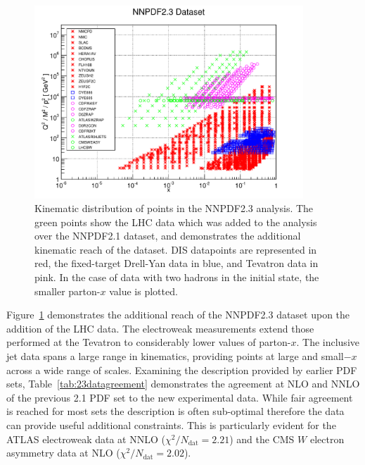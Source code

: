 \begin{figure}[h!]
\centering
\includegraphics[width=0.9\textwidth]{6-LHCimpact/figs/kin23.pdf}
\caption[Kinematic distribution of data points in the NNPDF2.3 analysis]{Kinematic distribution of points in the NNPDF2.3 analysis. The green points show the LHC data which was added to the analysis over the NNPDF2.1 dataset, and demonstrates the additional kinematic reach of the dataset. DIS datapoints are represented in red, the fixed-target Drell-Yan data in blue, and Tevatron data in pink. In the case of data with two hadrons in the initial state, the smaller parton-$x$ value is plotted.}
\label{fig:kin23}
\end{figure}



Figure~\ref{fig:kin23} demonstrates the additional reach of the NNPDF2.3 dataset upon the addition of the LHC data. The electroweak measurements extend those performed at the Tevatron to considerably lower values of parton-$x$. The inclusive jet data spans a large range in kinematics, providing points at large and small$-x$  across a wide range of scales. Examining the description provided by earlier PDF sets, Table~\ref{tab:23datagreement} demonstrates the agreement at NLO and NNLO of the previous 2.1 PDF set to the new experimental data. While fair agreement is reached for most sets the description is often sub-optimal therefore the data can provide useful additional constraints. This is particularly evident for the ATLAS electroweak data at NNLO ($\chi^2/N_{\text{dat}} = 2.21$) and the CMS $W$ electron asymmetry data at NLO ($\chi^2/N_{\text{dat}} = 2.02$).

